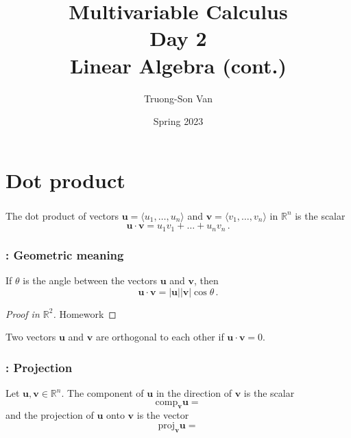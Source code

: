 \documentclass[aspectratio=169]{beamer}
\title{ Multivariable Calculus \\ Day 2 \\ Linear Algebra (cont.)}
\institute{Fulbright University Vietnam}
\author{Truong-Son Van}
\date{Spring 2023}
\newcommand{\vectorproj}[2][]{\mathrm{proj}_{\vect{#1}}\vect{#2}}
\newcommand{\vectorcomp}[2][]{\mathrm{comp}_{\vect{#1}}\vect{#2}}
\newcommand{\vect}{\mathbf}
\begin{document}
\maketitle

\section{Dot product}
\begin{frame}
    \frametitle{\secname}
    \begin{definition}
The dot product of vectors $\textbf{u} = \langle u_1, \dots, u_n \rangle$
and $\textbf{v} = \langle v_1, \dots, v_n \rangle$ in $\mathbb{R}^n$ is the
scalar
\begin{equation*}
    \textbf{u} \cdot \textbf{v} = u_1 v_1 +\dots + u_n v_n \,.
\end{equation*}
    \end{definition}
\end{frame}

\begin{frame}
    \frametitle{\secname: Geometric meaning}
    \begin{theorem}
If $\theta$ is the angle between the vectors $\textbf{u}$ and $\textbf{v}$, then
   \begin{equation*}
        \textbf{u}\cdot \textbf{v} = |\textbf{u}|| \textbf{v}| \cos \theta \,.
   \end{equation*}
    \end{theorem}
    \pause

    \begin{proof}[Proof in $\mathbb{R}^2$]
        Homework
    \end{proof}

    \pause
    \begin{corollary}
Two vectors $\textbf{u}$ and $\textbf{v}$ are orthogonal to each other
if $\textbf{u} \cdot \textbf{v} = 0$.
    \end{corollary}
\end{frame}

\begin{frame}
    \frametitle{\secname: Projection}
Let $\textbf{u}, \textbf{v}\in \mathbb{R}^n$. The component of $\textbf{u}$ 
in the direction of $\textbf{v}$ is the scalar
\begin{equation*}
\vectorcomp[v]{u} =  
\end{equation*}
and the projection of $\vect{u}$ onto $\vect{v}$ is the vector
\begin{equation*}
    \vectorproj[v]{u}  =
\end{equation*}
\end{frame}
\end{document}
